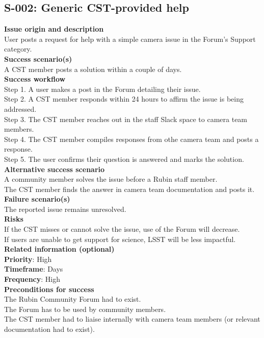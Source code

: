 \subsection{S-002: Generic CST-provided help}

\textbf {Issue origin and description} \\
User posts a request for help with a simple camera issue in the Forum's Support category. \\

\textbf {Success scenario(s)} \\
A CST member posts a solution within a couple of days. \\

\textbf {Success workflow} \\
Step 1. A user makes a post in the Forum detailing their issue. \\
Step 2. A CST member responds within 24 hours to affirm the issue is being addressed. \\
Step 3. The CST member reaches out in the staff Slack space to camera team members. \\
Step 4. The CST member compiles responses from othe camera team and posts a response. \\
Step 5. The user confirms their question is answered and marks the solution. \\

\textbf {Alternative success scenario} \\
A community member solves the issue before a Rubin staff member. \\
The CST member finds the answer in camera team documentation and posts it. \\

\textbf {Failure scenario(s)} \\
The reported issue remains unresolved. \\

\textbf {Risks}\\
If the CST misses or cannot solve the issue, use of the Forum will decrease. \\
If users are unable to get support for science, LSST will be less impactful. \\

\textbf {Related information (optional)} \\
\textbf{Priority}: High \\
\textbf{Timeframe}: Days \\
\textbf{Frequency}: High \\

\textbf {Preconditions for success}\\
The Rubin Community Forum had to exist. \\
The Forum has to be used by community members. \\
The CST member had to liaise internally with camera team members (or relevant documentation had to exist). \\
